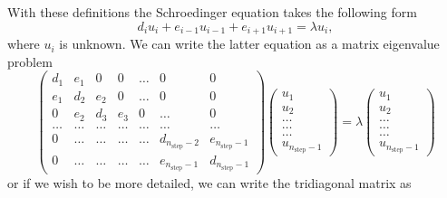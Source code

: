 \documentclass[%
twoside,                 %
final,                   %
10pt]{article}
\begin{document}
With these definitions the Schroedinger equation takes the following form
\[
d_iu_i+e_{i-1}u_{i-1}+e_{i+1}u_{i+1}  = \lambda u_i,
\]
where $u_i$ is unknown. We can write the 
latter equation as a matrix eigenvalue problem 
\begin{equation}
    \left( \begin{array}{ccccccc} d_1 & e_1 & 0   & 0    & \dots  &0     & 0 \\
                                e_1 & d_2 & e_2 & 0    & \dots  &0     &0 \\
                                0   & e_2 & d_3 & e_3  &0       &\dots & 0\\
                                \dots  & \dots & \dots & \dots  &\dots      &\dots & \dots\\
                                0   & \dots & \dots & \dots  &\dots       &d_{n_{\mathrm{step}}-2} & e_{n_{\mathrm{step}}-1}\\
                                0   & \dots & \dots & \dots  &\dots       &e_{n_{\mathrm{step}}-1} & d_{n_{\mathrm{step}}-1}

             \end{array} \right)      \left( \begin{array}{c} u_{1} \\
                                                              u_{2} \\
                                                              \dots\\ \dots\\ \dots\\
                                                              u_{n_{\mathrm{step}}-1}
             \end{array} \right)=\lambda \left( \begin{array}{c} u_{1} \\
                                                              u_{2} \\
                                                              \dots\\ \dots\\ \dots\\
                                                              u_{n_{\mathrm{step}}-1}
             \end{array} \right) 
      \label{eq:sematrix}
\end{equation} 
or if we wish to be more detailed, we can write the tridiagonal matrix as
\end{document}
